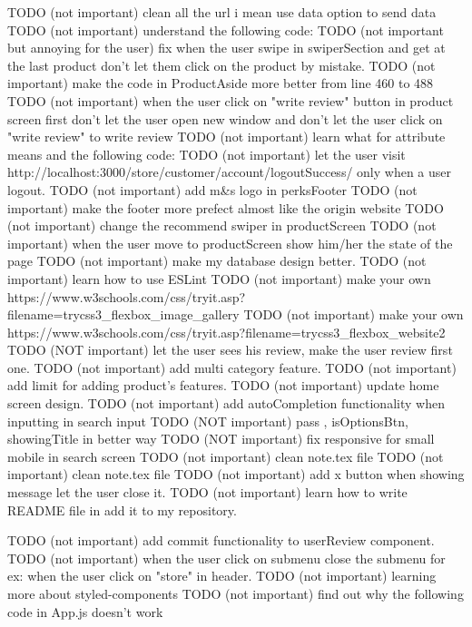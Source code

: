 TODO (not important) clean all the url i mean use data option to send data 
TODO (not important) understand the following code:
TODO (not important but annoying for the user) fix when the user swipe in swiperSection and get at the last product don't let them click on the product by mistake.
TODO (not important) make the code in ProductAside more better from line 460 to 488
TODO (not important) when the user click on "write review" button in product screen first don't let the user open new window and don't let the user click on "write review" to write review
TODO (not important) learn what for attribute means and the following code:
TODO (not important) let the user visit http://localhost:3000/store/customer/account/logoutSuccess/ only when a user logout.
TODO (not important) add m&s logo in perksFooter
TODO (not important) make the footer more prefect almost like the origin website
TODO (not important) change the recommend swiper in productScreen
TODO (not important) when the user move to productScreen show him/her the state of the page
TODO (not important) make my database design better.
TODO (not important) learn how to use ESLint
TODO (not important) make your own https://www.w3schools.com/css/tryit.asp?filename=trycss3_flexbox_image_gallery
TODO (not important) make your own https://www.w3schools.com/css/tryit.asp?filename=trycss3_flexbox_website2
TODO (NOT important) let the user sees his review, make the user review first one.
TODO (not important) add multi category feature.
TODO (not important) add limit for adding product's features. 
TODO (not important) update home screen design.
TODO (not important) add autoCompletion functionality when inputting in search input
TODO (NOT important) pass , isOptionsBtn, showingTitle in better way 
TODO (NOT important) fix responsive for small mobile in search screen
TODO (not important) clean note.tex file
TODO (not important) clean note.tex file
TODO (not important) add x button when showing message let the user close it. 
TODO (not important) learn how to write README file in add it to my repository.

TODO (not important) add commit functionality to userReview component.
TODO (not important) when the user click on submenu close the submenu for ex: when the user click on "store" in header.
TODO (not important) learning more about styled-components
TODO (not important) find out why the following code in App.js doesn't work
